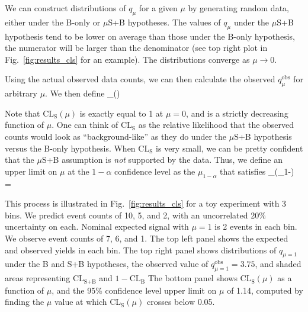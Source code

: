 We can construct distributions of $q_\mu$ for a given $\mu$ by generating random data, either under the B-only
or $\mu$S+B hypotheses. The values of $q_\mu$ under the $\mu$S+B hypothesis tend to be lower on average than those 
under the B-only hypothesis, the numerator will be larger than the denominator (see top right plot in 
Fig.~\ref{fig:results_cls} for an example). The distributions converge as $\mu\to0$.

Using the actual observed data counts, we can then calculate the observed $q_\mu^\text{obs}$ for arbitrary $\mu$.
We then define
\be
{}_(\mu) \equiv {} \equiv
{}
\ee

Note that $\text{CL}_\text{S}(\mu)$ is exactly equal to 1 at $\mu=0$, and is a strictly decreasing function of $\mu$.
One can think of $\text{CL}_\text{S}$ as the relative likelihood that the observed counts would look as ``background-like''
as they do under the $\mu$S+B hypothesis versus the B-only hypothesis. When CL$_\text{S}$ is very small,
we can be pretty confident that the $\mu$S+B assumption is \textit{not} supported by the data. Thus, we define
an upper limit on $\mu$ at the $1-\alpha$ confidence level as the $\mu_{1-\alpha}$ that satisfies
\be
{}_(\mu_{1-\alpha}) = \alpha
\ee

This process is illustrated in Fig.~\ref{fig:results_cls} for a toy experiment with 3 bins. We predict event counts of 
10, 5, and 2, with an uncorrelated 20\% uncertainty on each. Nominal expected signal with $\mu=1$ is
2 events in each bin. We observe event counts of 7, 6, and 1. The top left panel shows the expected and observed
yields in each bin. The top right panel shows distributions of $q_{\mu=1}$ under the B and S+B hypotheses, the
observed value of $q_{\mu=1}^\text{obs}=3.75$, and shaded areas representing CL$_\text{S+B}$ and $1-\text{CL}_\text{B}$
The bottom panel shows CL$_\text{S}(\mu)$ as a function of $\mu$, and the 95\% confidence level upper limit
on $\mu$ of 1.14, computed by finding the $\mu$ value at which CL$_\text{S}(\mu)$ crosses below 0.05.

